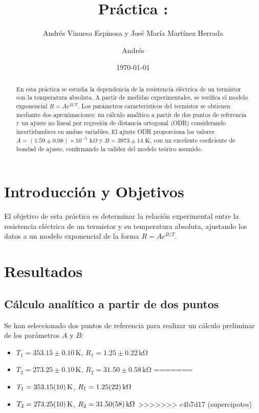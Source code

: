 \documentclass[11pt,a4paper]{article}
\title{Práctica \numeroPractica: \tituloPractica}
\author{Andrés Vinuesa Espinosa y José María Martínez Herrada}
\author{Andrés}
\date{\today}
\begin{document}
\maketitle

\begin{abstract}
En esta práctica se estudia la dependencia de la resistencia eléctrica de un termistor con la temperatura absoluta. A partir de medidas experimentales, se verifica el modelo exponencial $R = A e^{B/T}$. Los parámetros característicos del termistor se obtienen mediante dos aproximaciones: un cálculo analítico a partir de dos puntos de referencia y un ajuste no lineal por regresión de distancia ortogonal (ODR) considerando incertidumbres en ambas variables. El ajuste ODR proporciona los valores $A = (1.59 \pm 0.08) \times 10^{-5} \text{ k}\Omega$ y $B = 3973 \pm 14 \text{ K}$, con un excelente coeficiente de bondad de ajuste, confirmando la validez del modelo teórico asumido.
\end{abstract}

\section{Introducción y Objetivos}
El objetivo de esta práctica es determinar la relación experimental entre la resistencia eléctrica de un termistor y su temperatura absoluta, ajustando los datos a un modelo exponencial de la forma $R = A e^{B/T}$.

\section{Resultados}

\subsection{Cálculo analítico a partir de dos puntos}
Se han seleccionado dos puntos de referencia para realizar un cálculo preliminar de los parámetros $A$ y $B$:
\begin{itemize}
<<<<<<< HEAD
    \item $T_1 = 353.15 \pm 0.10\,\mathrm{K}$, $R_1 = 1.25 \pm 0.22\,\mathrm{k\Omega}$
    \item $T_2 = 273.25 \pm 0.10\,\mathrm{K}$, $R_2 = 31.50 \pm 0.58\,\mathrm{k\Omega}$
=======
    \item $T_1 = \qty{353.15 \pm 0.10}{K}$, $R_1 = \qty{1.25 \pm 0.22}{k\Omega}$
    \item $T_2 = \qty{273.25 \pm 0.10}{K}$, $R_2 = \qty{31.50 \pm 0.58}{k\Omega}$
>>>>>>> c4b7d17 (supercipotes)
\end{itemize}
\end{document}
